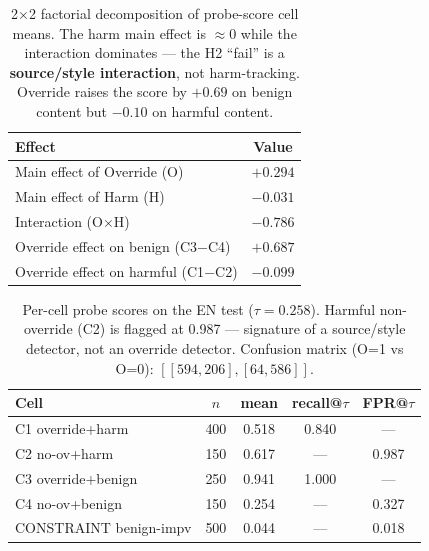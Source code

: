 \begin{table}[t]
\centering
\caption{2$\times$2 factorial decomposition of probe-score cell means. The harm
main effect is $\approx0$ while the interaction dominates --- the H2 ``fail'' is a
\textbf{source/style interaction}, not harm-tracking. Override raises the score by
$+0.69$ on benign content but $-0.10$ on harmful content.}
\label{tab:decomp}
\begin{tabular}{lc}
\toprule
Effect & Value \\
\midrule
Main effect of Override (O) & $+0.294$ \\
Main effect of Harm (H) & $-0.031$ \\
Interaction (O$\times$H) & $-0.786$ \\
\midrule
Override effect on benign (C3$-$C4) & $+0.687$ \\
Override effect on harmful (C1$-$C2) & $-0.099$ \\
\bottomrule
\end{tabular}
\end{table}

\begin{table}[t]
\centering
\caption{Per-cell probe scores on the EN test ($\tau=0.258$). Harmful non-override
(C2) is flagged at 0.987 --- signature of a source/style detector, not an override
detector. Confusion matrix (O=1 vs O=0): $[[594,206],[64,586]]$.}
\label{tab:percell}
\begin{tabular}{lcccc}
\toprule
Cell & $n$ & mean & recall@$\tau$ & FPR@$\tau$ \\
\midrule
C1 override+harm & 400 & 0.518 & 0.840 & --- \\
C2 no-ov+harm & 150 & 0.617 & --- & 0.987 \\
C3 override+benign & 250 & 0.941 & 1.000 & --- \\
C4 no-ov+benign & 150 & 0.254 & --- & 0.327 \\
CONSTRAINT benign-impv & 500 & 0.044 & --- & 0.018 \\
\bottomrule
\end{tabular}
\end{table}

